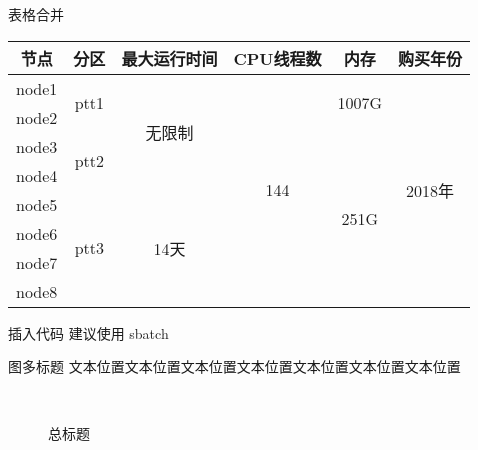 \documentclass{../../ppt/ldrsimple}
\begin{document}
\begin{frame}{表格合并}
    \begin{table}
        \begin{tabular}{c|c|c|c|c|c}
            \toprule 节点                  & 分区                    & 最大运行时间               & CPU线程数               & 内存                     & 购买年份                   \\
            \midrule node1               & \multirow{2}{*}{ptt1} & \multirow{4}{*}{无限制} & \multirow{8}{*}{144} & \multirow{2}{*}{1007G} & \multirow{8}{*}{2018年} \\
            \cline{1-1} node2            &                       &                      &                      &                        &                        \\
            \cline{1-2}\cline{5-5} node3 & \multirow{2}{*}{ptt2} &                      &                      & \multirow{6}{*}{251G}  &                        \\
            \cline{1-1} node4            &                       &                      &                      &                        &                        \\
            \cline{1-3} node5            & \multirow{4}{*}{ptt3} & \multirow{4}{*}{14天} &                      &                        &                        \\
            \cline{1-1} node6            &                       &                      &                      &                        &                        \\
            \cline{1-1} node7            &                       &                      &                      &                        &                        \\
            \cline{1-1} node8            &                       &                      &                      &                        &                        \\
            \bottomrule
        \end{tabular}
    \end{table}

\end{frame}



\begin{frame}{插入代码}
    建议使用 sbatch
    
\end{frame}

\begin{frame}{图多标题}
文本位置文本位置文本位置文本位置文本位置文本位置文本位置
    \begin{figure}[H]
        \centering
        \caption{总标题}
        \\
    \end{figure}
\end{frame}
\end{document}
